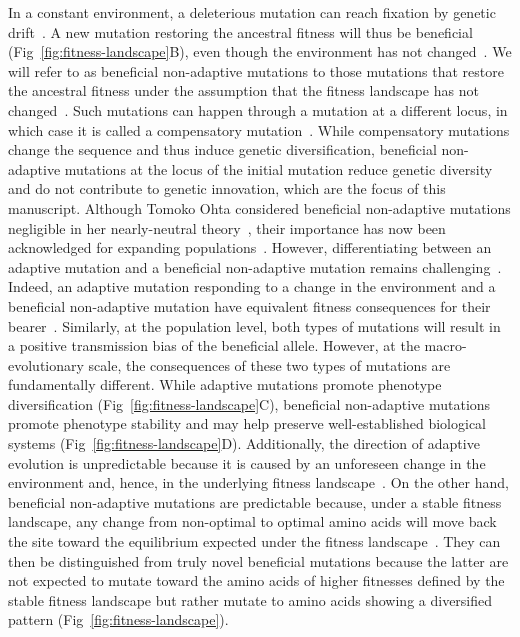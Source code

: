 \documentclass[10pt,letterpaper]{article}
\begin{document}
In a constant environment, a deleterious mutation can reach fixation by genetic drift~\cite{ohta_nearly_1992}.
A new mutation restoring the ancestral fitness will thus be beneficial (Fig~\ref{fig:fitness-landscape}B), even though the environment has not changed~\cite{gillespie_ohta_1995, hartl_compensatory_1996, sella_application_2005, mustonen_fitness_2009, cvijovic_fate_2015}.
We will refer to as beneficial non-adaptive mutations to those mutations that restore the ancestral fitness under the assumption that the fitness landscape has not changed~\cite{piganeau_estimating_2003, charlesworth_other_2007}.
Such mutations can happen through a mutation at a different locus, in which case it is called a compensatory mutation~\cite{hartl_compensatory_1996, mustonen_fitness_2009}.
While compensatory mutations change the sequence and thus induce genetic diversification, beneficial non-adaptive mutations at the locus of the initial mutation reduce genetic diversity and do not contribute to genetic innovation, which are the focus of this manuscript.
Although Tomoko Ohta considered beneficial non-adaptive mutations negligible in her nearly-neutral theory~\cite{ohta_nearly_1992}, their importance has now been acknowledged for expanding populations~\cite{charlesworth_other_2007}.
However, differentiating between an adaptive mutation and a beneficial non-adaptive mutation remains challenging~\cite{chi_detecting_2020}.
Indeed, an adaptive mutation responding to a change in the environment and a beneficial non-adaptive mutation have equivalent fitness consequences for their bearer~\cite{charlesworth_other_2007}.
Similarly, at the population level, both types of mutations will result in a positive transmission bias of the beneficial allele.
However, at the macro-evolutionary scale, the consequences of these two types of mutations are fundamentally different.
While adaptive mutations promote phenotype diversification (Fig~\ref{fig:fitness-landscape}C), beneficial non-adaptive mutations promote phenotype stability and may help preserve well-established biological systems (Fig~\ref{fig:fitness-landscape}D).
Additionally, the direction of adaptive evolution is unpredictable because it is caused by an unforeseen change in the environment and, hence, in the underlying fitness landscape~\cite{bazykin_changing_2015}.
On the other hand, beneficial non-adaptive mutations are predictable because, under a stable fitness landscape, any change from non-optimal to optimal amino acids will move back the site toward the equilibrium expected under the fitness landscape~\cite{moses_inferring_2009, fischer_germline_2011, chen_hunting_2021}.
They can then be distinguished from truly novel beneficial mutations because the latter are not expected to mutate toward the amino acids of higher fitnesses defined by the stable fitness landscape but rather mutate to amino acids showing a diversified pattern (Fig~\ref{fig:fitness-landscape}).
\end{document}
